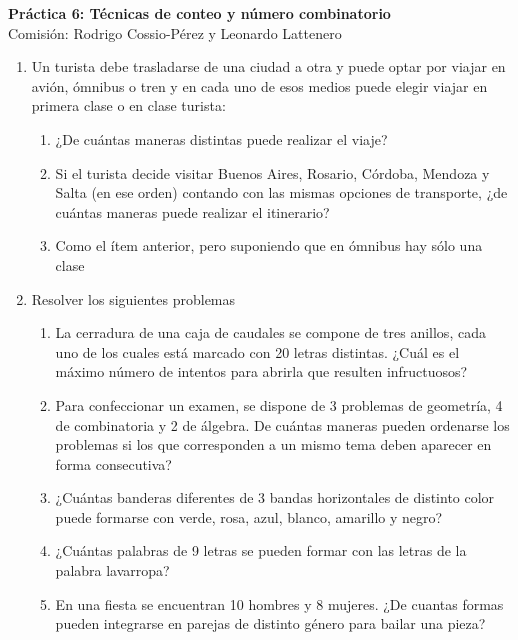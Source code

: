 \documentclass[a4paper]{article}
\newcommand{\exercise}{\item}
\begin{document}
\noindent \hrulefill 
\vspace{-7pt}
\begin{center} 
	\textbf{ Práctica 6: Técnicas de conteo y número combinatorio} \\
	Comisión: Rodrigo Cossio-Pérez y Leonardo Lattenero
\end{center}
\vspace{-10pt}
\hrulefill
\begin{enumerate}
	\exercise Un turista debe trasladarse de una ciudad a otra y puede optar por viajar en avión, ómnibus o tren y en cada uno de esos medios puede elegir viajar en primera clase o en clase turista:
	\begin{enumerate} [label=(\alph*)]
		\item ¿De cuántas maneras distintas puede realizar el viaje?
		\item Si el turista decide visitar Buenos Aires, Rosario, Córdoba, Mendoza y Salta (en ese orden) contando con las mismas opciones de transporte, ¿de cuántas maneras puede realizar el itinerario?
		\item Como el ítem anterior, pero suponiendo que en ómnibus hay sólo una clase
	\end{enumerate}
	\exercise Resolver los siguientes problemas %
	\begin{enumerate} [label=(\alph*)]
		\item La cerradura de una caja de caudales se compone de tres anillos, cada uno de los cuales está marcado con 20 letras distintas. ¿Cuál es el máximo número de intentos para abrirla que resulten infructuosos?
		\item Para confeccionar un examen, se dispone de 3 problemas de geometría, 4 de combinatoria y 2 de álgebra. De cuántas maneras pueden ordenarse los problemas si los que corresponden a un mismo tema deben aparecer en forma consecutiva?
		\item ¿Cuántas banderas diferentes de 3 bandas horizontales de distinto color puede formarse con verde, rosa, azul, blanco, amarillo y negro?
		\item ¿Cuántas palabras de 9 letras se pueden formar con las letras de la palabra lavarropa?
		\item En una fiesta se encuentran 10 hombres y 8 mujeres. ¿De cuantas formas pueden integrarse en parejas de distinto género para bailar una pieza?

\end{enumerate}
\end{enumerate}
\end{document}
